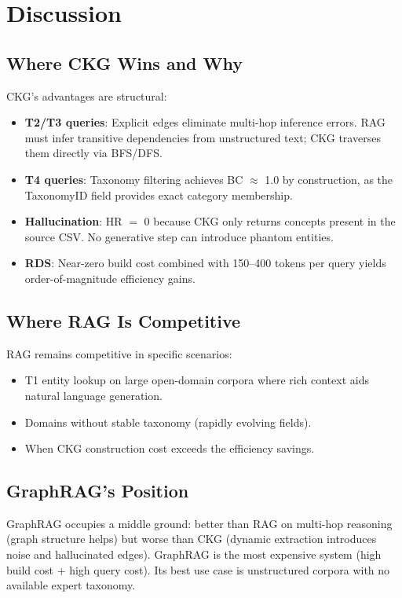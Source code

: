 \section{Discussion}\label{sec:discussion}

\subsection{Where CKG Wins and Why}\label{sec:disc-ckg-wins}

CKG's advantages are structural:
\begin{itemize}
  \item \textbf{T2/T3 queries}: Explicit edges eliminate multi-hop inference errors.
    RAG must infer transitive dependencies from unstructured text; CKG traverses
    them directly via BFS/DFS.
  \item \textbf{T4 queries}: Taxonomy filtering achieves BC $\approx$ 1.0 by
    construction, as the TaxonomyID field provides exact category membership.
  \item \textbf{Hallucination}: HR $=$ 0 because CKG only returns concepts
    present in the source CSV. No generative step can introduce phantom entities.
  \item \textbf{RDS}: Near-zero build cost combined with 150--400 tokens per
    query yields order-of-magnitude efficiency gains.
\end{itemize}

\subsection{Where RAG Is Competitive}\label{sec:disc-rag}

RAG remains competitive in specific scenarios:
\begin{itemize}
  \item T1 entity lookup on large open-domain corpora where rich context aids
    natural language generation.
  \item Domains without stable taxonomy (rapidly evolving fields).
  \item When CKG construction cost exceeds the efficiency savings.
\end{itemize}

\subsection{GraphRAG's Position}\label{sec:disc-graphrag}

GraphRAG occupies a middle ground: better than RAG on multi-hop reasoning
(graph structure helps) but worse than CKG (dynamic extraction introduces
noise and hallucinated edges). GraphRAG is the most expensive system
(high build cost + high query cost). Its best use case is unstructured
corpora with no available expert taxonomy.

